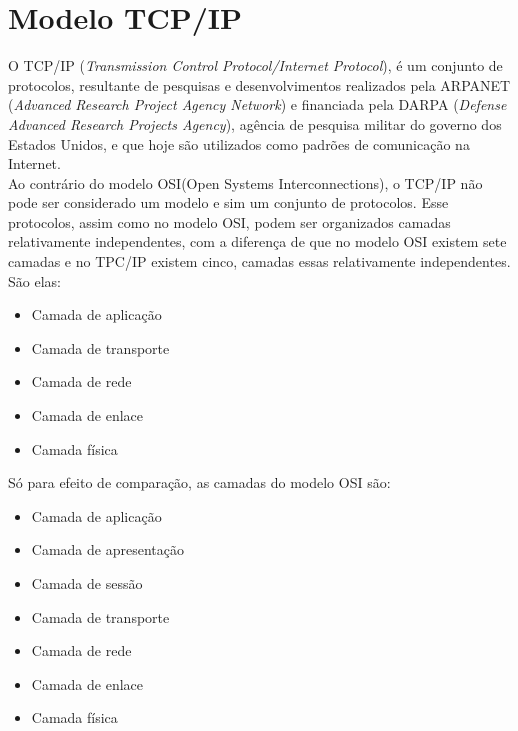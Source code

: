 \section{Modelo TCP/IP}
O TCP/IP (\textit{Transmission Control Protocol/Internet Protocol}), é um conjunto de protocolos, resultante de pesquisas e desenvolvimentos realizados pela ARPANET (\textit{Advanced Research Project Agency Network}) e financiada pela DARPA (\textit{Defense Advanced Research Projects Agency}), agência de pesquisa militar do governo dos Estados Unidos, e que hoje são utilizados como padrões de comunicação na Internet.\\
Ao contrário do modelo OSI(Open Systems Interconnections), o TCP/IP não pode ser considerado um modelo e sim um conjunto de protocolos. Esse protocolos, assim como no modelo OSI, podem ser organizados camadas relativamente independentes, com a diferença de que no modelo OSI existem sete camadas e no TPC/IP existem cinco, camadas essas relativamente independentes. São elas:
\begin{itemize}
	\item Camada de aplicação
	\item Camada de transporte
	\item Camada de rede
	\item Camada de enlace
	\item Camada física
\end{itemize}
Só para efeito de comparação, as camadas do modelo OSI são:
\begin{itemize}
	\item Camada de aplicação
	\item Camada de apresentação
	\item Camada de sessão
	\item Camada de transporte
	\item Camada de rede
	\item Camada de enlace
	\item Camada física
\end{itemize}

